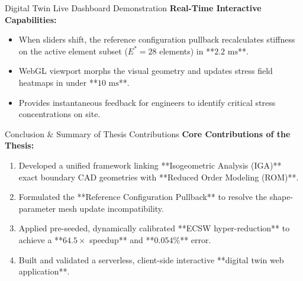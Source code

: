 \documentclass[aspectratio=169, 10pt]{beamer}
\begin{document}
\begin{frame}{Digital Twin Live Dashboard Demonstration}
    \textbf{Real-Time Interactive Capabilities:}
    \begin{itemize}
        \item When sliders shift, the reference configuration pullback recalculates stiffness on the active element subset ($E^*=28$ elements) in **$2.2\text{ ms}$**.
        \item WebGL viewport morphs the visual geometry and updates stress field heatmaps in under **$10\text{ ms}$**.
        \item Provides instantaneous feedback for engineers to identify critical stress concentrations on site.
    \end{itemize}
    \centering
    \vspace{0.3cm}
\end{frame}

\begin{frame}{Conclusion \& Summary of Thesis Contributions}
    \textbf{Core Contributions of the Thesis:}
    \begin{enumerate}
        \item Developed a unified framework linking **Isogeometric Analysis (IGA)** exact boundary CAD geometries with **Reduced Order Modeling (ROM)**.
        \item Formulated the **Reference Configuration Pullback** to resolve the shape-parameter mesh update incompatibility.
        \item Applied pre-seeded, dynamically calibrated **ECSW hyper-reduction** to achieve a **$64.5\times$ speedup** and **$0.054\%$** error.
        \item Built and validated a serverless, client-side interactive **digital twin web application**.
    \end{enumerate}
\end{frame}
\end{document}
